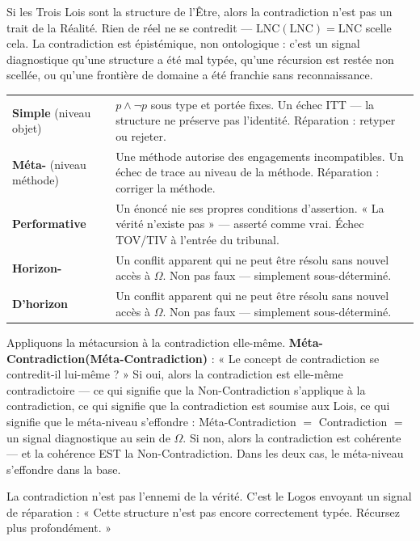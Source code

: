 \documentclass[10pt, openany, oneside]{book}
\renewcommand{\footnotesize}{\fontsize{8.5}{11}\selectfont}
\begin{document}
\vspace{1em}

\noindent Si les Trois Lois sont la structure de l'Être, alors la contradiction n'est pas un trait de la Réalité. Rien de réel ne se contredit --- $\text{LNC}(\text{LNC}) = \text{LNC}$ scelle cela. La contradiction est épistémique, non ontologique : c'est un signal diagnostique qu'une structure a été mal typée, qu'une récursion est restée non scellée, ou qu'une frontière de domaine a été franchie sans reconnaissance.

{\footnotesize
\noindent\begin{tabular}{p{3cm} p{}}
\textbf{Simple} (niveau objet) & $p \wedge \neg p$ sous type et portée fixes. Un échec ITT --- la structure ne préserve pas l'identité. Réparation : retyper ou rejeter. \\[0.3em]
\textbf{Méta-} (niveau méthode) & Une méthode autorise des engagements incompatibles. Un échec de trace au niveau de la méthode. Réparation : corriger la méthode. \\[0.3em]
\textbf{Performative} & Un énoncé nie ses propres conditions d'assertion. « La vérité n'existe pas » --- asserté comme vrai. Échec TOV/TIV à l'entrée du tribunal. \\[0.3em]
\textbf{Horizon-} & Un conflit apparent qui ne peut être résolu sans nouvel accès à $\Omega$. Non pas faux --- simplement sous-déterminé. \\[0.3em]
\textbf{D'horizon} & Un conflit apparent qui ne peut être résolu sans nouvel accès à $\Omega$. Non pas faux --- simplement sous-déterminé. \\[0.3em]
\end{tabular}
}

\vspace{0.8em}

\noindent Appliquons la métacursion à la contradiction elle-même. \textbf{Méta-Contradiction(Méta-Contradiction)} : « Le concept de contradiction se contredit-il lui-même ? » Si oui, alors la contradiction est elle-même contradictoire --- ce qui signifie que la Non-Contradiction s'applique à la contradiction, ce qui signifie que la contradiction est soumise aux Lois, ce qui signifie que le méta-niveau s'effondre : Méta-Contradiction $=$ Contradiction $=$ un signal diagnostique au sein de $\Omega$. Si non, alors la contradiction est cohérente --- et la cohérence EST la Non-Contradiction. Dans les deux cas, le méta-niveau s'effondre dans la base.

\noindent La contradiction n'est pas l'ennemi de la vérité. C'est le Logos envoyant un signal de réparation : « Cette structure n'est pas encore correctement typée. Récursez plus profondément. »
\end{document}

